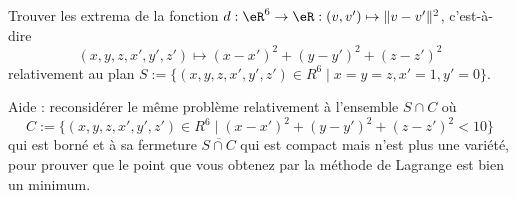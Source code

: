 
\begin{exercice}\label{exoVariete0004}

Trouver les extrema de la fonction $d:\eR^6 \rightarrow \eR: (v,v') \mapsto \|v-v'\|^2$, c'est-à-dire
\begin{equation}
	(x,y,z,x',y',z') \mapsto (x-x')^2+(y-y')^2+(z- z')^2
\end{equation}
relativement au plan $S :=\{ (x,y,z,x',y',z') \in R^6 \mid x=y=z, x'=1, y'=0 \}$.

Aide : reconsidérer le même problème relativement à l'ensemble $S\cap C$ où
\begin{equation}
	C :=\{ (x,y,z,x',y',z') \in R^6 \mid (x-x')^2+(y-y')^2+(z- z')^2<10 \}
\end{equation}
qui est borné et à sa fermeture $\overline{S \cap C}$ qui est compact mais n'est plus une variété, pour prouver que le point que vous obtenez par la méthode de Lagrange est bien un minimum.


\end{exercice}
